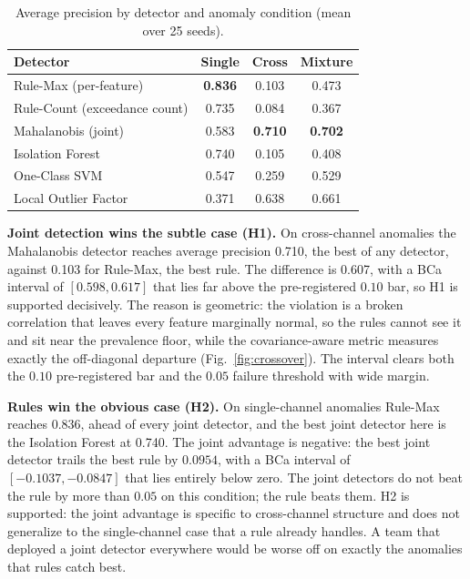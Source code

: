 \documentclass[journal]{IEEEtran}
\begin{document}
\begin{table}[t]
\centering
\caption{Average precision by detector and anomaly condition (mean over 25 seeds).}
\label{tab:ap}
\footnotesize
\setlength{\tabcolsep}{4pt}
\begin{tabular}{@{}lccc@{}}
\toprule
Detector & Single & Cross & Mixture \\
\midrule
Rule-Max (per-feature)        & \textbf{0.836} & 0.103 & 0.473 \\
Rule-Count (exceedance count) & 0.735 & 0.084 & 0.367 \\
Mahalanobis (joint)           & 0.583 & \textbf{0.710} & \textbf{0.702} \\
Isolation Forest              & 0.740 & 0.105 & 0.408 \\
One-Class SVM                 & 0.547 & 0.259 & 0.529 \\
Local Outlier Factor          & 0.371 & 0.638 & 0.661 \\
\bottomrule
\end{tabular}
\end{table}

\textbf{Joint detection wins the subtle case (H1).} On cross-channel anomalies the Mahalanobis
detector reaches average precision 0.710, the best of any detector, against 0.103 for Rule-Max, the
best rule. The difference is 0.607, with a BCa interval of $[0.598, 0.617]$ that lies far above the
pre-registered $0.10$ bar, so H1 is supported decisively. The reason is geometric: the violation is
a broken correlation that leaves every feature marginally normal, so the rules cannot see it and sit
near the prevalence floor, while the covariance-aware metric measures exactly the off-diagonal
departure (Fig.~\ref{fig:crossover}). The interval clears both the $0.10$ pre-registered bar and the
$0.05$ failure threshold with wide margin.

\textbf{Rules win the obvious case (H2).} On single-channel anomalies Rule-Max reaches 0.836, ahead
of every joint detector, and the best joint detector here is the Isolation Forest at 0.740. The
joint advantage is negative: the best joint detector trails the best rule by $0.0954$, with a BCa
interval of $[-0.1037, -0.0847]$ that lies entirely below zero. The joint detectors do not beat the
rule by more than $0.05$ on this condition; the rule beats them. H2 is supported: the joint
advantage is specific to cross-channel structure and does not generalize to the single-channel case
that a rule already handles. A team that deployed a joint detector everywhere would be worse off on
exactly the anomalies that rules catch best.
\end{document}
